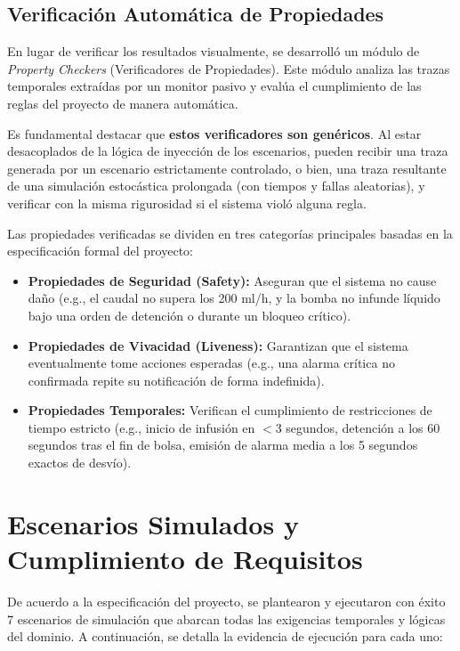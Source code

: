 \subsection{Verificación Automática de Propiedades}
En lugar de verificar los resultados visualmente, se desarrolló un módulo de \textit{Property Checkers} (Verificadores de Propiedades). Este módulo analiza las trazas temporales extraídas por un monitor pasivo y evalúa el cumplimiento de las reglas del proyecto de manera automática.

Es fundamental destacar que \textbf{estos verificadores son genéricos}. Al estar desacoplados de la lógica de inyección de los escenarios, pueden recibir una traza generada por un escenario estrictamente controlado, o bien, una traza resultante de una simulación estocástica prolongada (con tiempos y fallas aleatorias), y verificar con la misma rigurosidad si el sistema violó alguna regla.

Las propiedades verificadas se dividen en tres categorías principales basadas en la especificación formal del proyecto:
\begin{itemize}
    \item \textbf{Propiedades de Seguridad (Safety):} Aseguran que el sistema no cause daño (e.g., el caudal no supera los 200 ml/h, y la bomba no infunde líquido bajo una orden de detención o durante un bloqueo crítico).
    \item \textbf{Propiedades de Vivacidad (Liveness):} Garantizan que el sistema eventualmente tome acciones esperadas (e.g., una alarma crítica no confirmada repite su notificación de forma indefinida).
    \item \textbf{Propiedades Temporales:} Verifican el cumplimiento de restricciones de tiempo estricto (e.g., inicio de infusión en $<3$ segundos, detención a los 60 segundos tras el fin de bolsa, emisión de alarma media a los 5 segundos exactos de desvío).
\end{itemize}

\section{Escenarios Simulados y Cumplimiento de Requisitos}

De acuerdo a la especificación del proyecto, se plantearon y ejecutaron con éxito 7 escenarios de simulación que abarcan todas las exigencias temporales y lógicas del dominio. A continuación, se detalla la evidencia de ejecución para cada uno:

